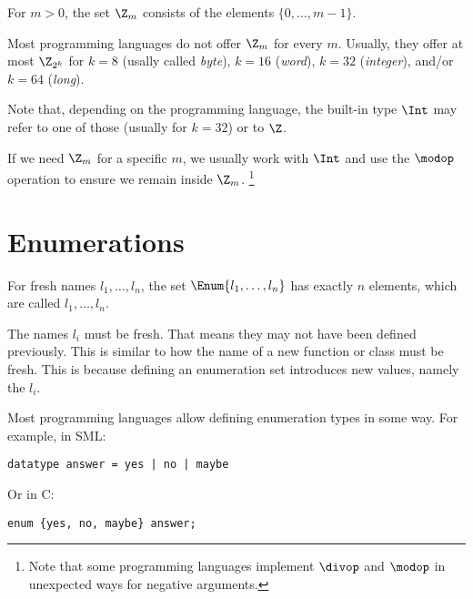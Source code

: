 For $m>0$, the set $\Z_m$ consists of the elements $\{0,\ldots,m-1\}$.

Most programming languages do not offer $\Z_m$ for every $m$.
Usually, they offer at most $\Z_{2^k}$ for $k=8$ (usally called \emph{byte}), $k=16$ (\emph{word}), $k=32$ (\emph{integer}), and/or $k=64$ (\emph{long}).

Note that, depending on the programming language, the built-in type $\Int$ may refer to one of those (usually for $k=32$) or to $\Z$.

If we need $\Z_m$ for a specific $m$, we usually work with $\Int$ and use the $\modop$ operation to ensure we remain inside $\Z_m$.
\footnote{Note that some programming languages implement $\divop$ and $\modop$ in unexpected ways for negative arguments.}

\section{Enumerations}

For fresh names $l_1,\ldots,l_n$, the set $\Enum\{l_1,\ldots,l_n\}$ has exactly $n$ elements, which are called $l_1,\ldots,l_n$.

The names $l_i$ must be fresh.
That means they may not have been defined previously.
This is similar to how the name of a new function or class must be fresh.
This is because defining an enumeration set introduces new values, namely the $l_i$.

Most programming languages allow defining enumeration types in some way.
For example, in SML:

\begin{lstlisting}
datatype answer = yes | no | maybe
\end{lstlisting}

Or in C:

\begin{lstlisting}
enum {yes, no, maybe} answer;
\end{lstlisting}
